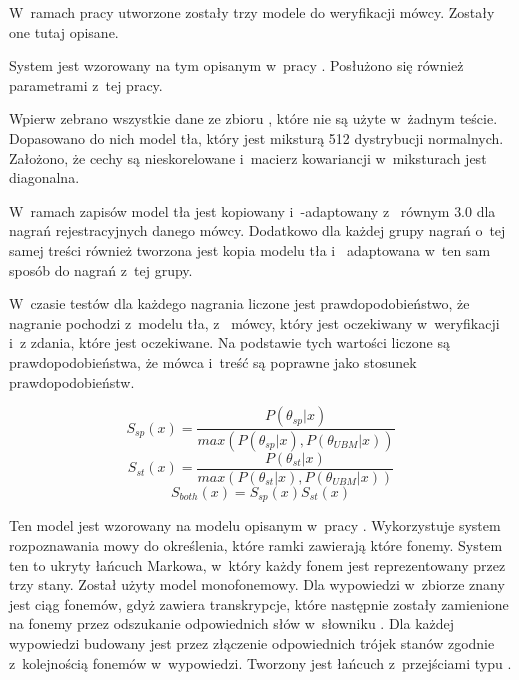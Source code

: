 W~ramach pracy utworzone zostały trzy modele do weryfikacji mówcy. Zostały one tutaj opisane.

\label{sec:gmm_ubm}

System  jest wzorowany na tym opisanym w~pracy \cite{utteranceVerificationFor}. Posłużono
się również parametrami z~tej pracy.

Wpierw zebrano wszystkie dane ze zbioru , które nie są użyte w~żadnym teście. Dopasowano
do nich model tła, który jest miksturą 512 dystrybucji normalnych. Założono, że cechy są nieskorelowane
i~macierz kowariancji w~miksturach jest diagonalna.

W~ramach zapisów model tła jest kopiowany i~-adaptowany z~ równym $3.0$
dla nagrań rejestracyjnych danego mówcy. Dodatkowo dla każdej grupy nagrań o~tej samej treści również tworzona
jest kopia modelu tła i~ adaptowana w~ten sam sposób do nagrań z~tej grupy.

W~czasie testów dla każdego nagrania liczone jest prawdopodobieństwo, że nagranie pochodzi z~modelu tła,
z~ mówcy, który jest oczekiwany w~weryfikacji i~z  zdania, które jest oczekiwane.
Na podstawie tych wartości liczone są prawdopodobieństwa, że mówca i~treść są poprawne jako stosunek prawdopodobieństw.

$$S_{sp}(x) = \frac{P(\theta_{sp} | x)}{max(P(\theta_{sp} | x), P(\theta_{UBM} | x))}$$
$$S_{st}(x) = \frac{P(\theta_{st} | x)}{max(P(\theta_{st} | x), P(\theta_{UBM} | x))}$$
$$S_{both}(x) = S_{sp}(x) S_{st}(x)$$

\label{sec:hmm_gmm}

Ten model jest wzorowany na modelu opisanym w~pracy \cite{comparisonOfMultiple}. Wykorzystuje
system rozpoznawania mowy do określenia, które ramki zawierają które fonemy. System ten
to ukryty łańcuch Markowa, w~który każdy fonem jest reprezentowany przez trzy stany. Został
użyty model monofonemowy. Dla wypowiedzi w~zbiorze znany jest ciąg fonemów, gdyż
 zawiera transkrypcje, które następnie zostały zamienione na fonemy
przez odszukanie odpowiednich słów w~słowniku . Dla każdej wypowiedzi
budowany jest  przez złączenie odpowiednich trójek stanów zgodnie z~kolejnością
fonemów w~wypowiedzi. Tworzony jest łańcuch z~przejściami typu .

